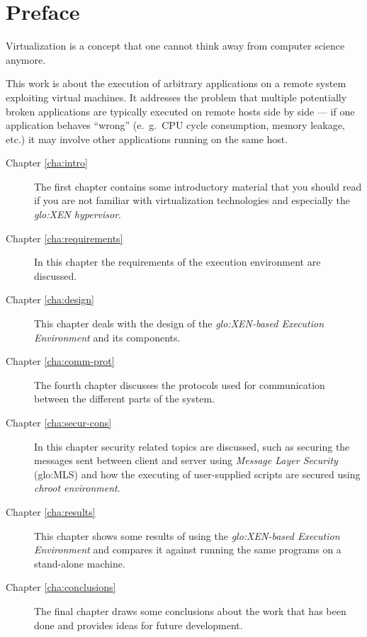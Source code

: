 
\chapter{Preface}
\thispagestyle{empty}

Virtualization  is a  concept that  one  cannot think  away from  computer
science anymore.

This work  is about  the execution of  arbitrary applications on  a remote
system exploiting virtual machines. It addresses the problem that multiple
potentially  broken applications  are typically  executed on  remote hosts
side by  side ---  if one application  behaves ``wrong''  (e.~g.~CPU cycle
consumption,  memory  leakage, etc.)  it  may  involve other  applications
running on the same host.

\vfill

\begin{description}
\item[Chapter   \ref{cha:intro}]   The   first   chapter   contains   some
  introductory material that you should  read if you are not familiar with
  virtualization  technologies   and  especially  the  \emph{\gls{glo:XEN}
    hypervisor}.
  
\item[Chapter \ref{cha:requirements}] In  this chapter the requirements of
  the execution environment are discussed.
  
\item[Chapter \ref{cha:design}] This chapter  deals with the design of the
  \emph{\gls{glo:XEN}-based Execution Environment} and its components.
  
\item[Chapter  \ref{cha:comm-prot}]  The   fourth  chapter  discusses  the
  protocols  used for  communication between  the different  parts  of the
  system.
  
\item[Chapter  \ref{cha:secur-cons}]  In  this  chapter  security  related
  topics are discussed, such as  securing the messages sent between client
  and server  using \emph{Message Layer Security}  (\gls{glo:MLS}) and how
  the executing  of user-supplied  scripts are secured  using \emph{chroot
    environment}.
  
\item[Chapter \ref{cha:results}] This chapter  shows some results of using
  the  \emph{\gls{glo:XEN}-based Execution  Environment}  and compares  it
  against running the same programs on a stand-alone machine.
  
\item[Chapter   \ref{cha:conclusions}]  The   final  chapter   draws  some
  conclusions about  the work  that has been  done and provides  ideas for
  future development.
  
\end{description}

\clearpage

